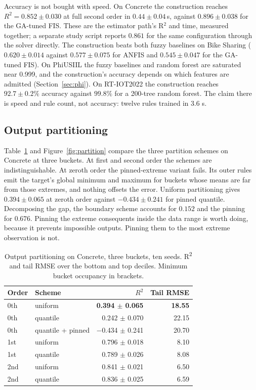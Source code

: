 \documentclass[journal]{IEEEtran}
\begin{document}
Accuracy is not bought with speed. On Concrete the construction reaches $R^2 = 0.852 \pm 0.030$ at full second order in $0.44 \pm 0.04$\,s, against $0.896 \pm 0.038$ for the GA-tuned FIS. These are the estimator path's R$^2$ and time, measured together; a separate study script reports $0.861$ for the same configuration through the solver directly. The construction beats both fuzzy baselines on Bike Sharing ($0.620 \pm 0.014$ against $0.577 \pm 0.075$ for ANFIS and $0.545 \pm 0.047$ for the GA-tuned FIS). On PhiUSIIL the fuzzy baselines and random forest are saturated near 0.999, and the construction's accuracy depends on which features are admitted (Section~\ref{sec:phi}). On RT-IOT2022 the construction reaches $92.7 \pm 0.2\%$ accuracy against $99.8\%$ for a 200-tree random forest. The claim there is speed and rule count, not accuracy: twelve rules trained in $3.6$ s.


\subsection{Output partitioning}
\label{sec:partition}
Table~\ref{tab:partition} and Figure~\ref{fig:partition} compare the three partition schemes on Concrete at three buckets. At first and second order the schemes are indistinguishable. At zeroth order the pinned-extreme variant fails. Its outer rules emit the target's global minimum and maximum for buckets whose means are far from those extremes, and nothing offsets the error. Uniform partitioning gives $0.394 \pm 0.065$ at zeroth order against $-0.434 \pm 0.241$ for pinned quantile. Decomposing the gap, the boundary scheme accounts for $0.152$ and the pinning for $0.676$. Pinning the extreme consequents inside the data range is worth doing, because it prevents impossible outputs. Pinning them to the most extreme observation is not.

\begin{table}[t]
\centering
\caption{Output partitioning on Concrete, three buckets, ten seeds. R\textsuperscript{2} and tail RMSE over the bottom and top deciles. Minimum bucket occupancy in brackets.}
\label{tab:partition}
\begin{tabular}{llrr}
\toprule
Order & Scheme & $R^2$ & Tail RMSE \\
\midrule
0th & uniform & \textbf{0.394 $\pm$ 0.065} & \textbf{18.55} \\
0th & quantile & 0.242 $\pm$ 0.070 & 22.15 \\
0th & quantile + pinned & $-$0.434 $\pm$ 0.241 & 20.70 \\
1st & uniform & 0.796 $\pm$ 0.018 & 8.10 \\
1st & quantile & 0.789 $\pm$ 0.026 & 8.08 \\
2nd & uniform & 0.841 $\pm$ 0.021 & 6.50 \\
2nd & quantile & 0.836 $\pm$ 0.025 & 6.59 \\
\bottomrule
\end{tabular}
\end{table}
\end{document}
